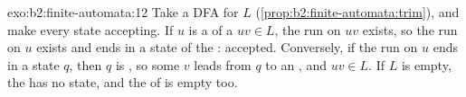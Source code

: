 \begin{solution}{exo:b2:finite-automata:12}
Take a  DFA for $L$ (\cref{prop:b2:finite-automata:trim}), and make every state accepting. If $u$ is a  of
a  $uv \in L$, the run on $uv$ exists, so the run on $u$ exists and ends in a state of the :
accepted. Conversely, if the run on $u$ ends in a state $q$, then $q$ is , so some $v$ leads from $q$ to
an , and $uv \in L$. If $L$ is empty, the  has no state, and the  of  is
empty too.
\end{solution}

